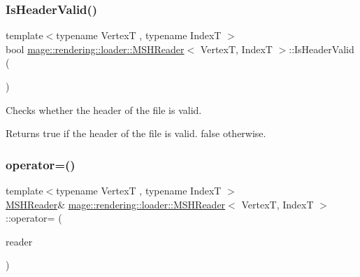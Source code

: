 \subsubsection{\texorpdfstring{Is\+Header\+Valid()}{IsHeaderValid()}}
{\footnotesize\ttfamily template$<$typename VertexT , typename IndexT $>$ \\
bool \mbox{\hyperlink{classmage_1_1rendering_1_1loader_1_1_m_s_h_reader}{mage\+::rendering\+::loader\+::\+M\+S\+H\+Reader}}$<$ VertexT, IndexT $>$\+::Is\+Header\+Valid (\begin{DoxyParamCaption}{ }\end{DoxyParamCaption})\hspace{0.3cm}{\ttfamily [private]}}

Checks whether the header of the file is valid.

\begin{DoxyReturn}{Returns}
{\ttfamily true} if the header of the file is valid. {\ttfamily false} otherwise. 
\end{DoxyReturn}
\mbox{\label{classmage_1_1rendering_1_1loader_1_1_m_s_h_reader_a106e5a6cce46777cf7ae36cb4034e1a0}} 
\subsubsection{\texorpdfstring{operator=()}{operator=()}\hspace{0.1cm}{\footnotesize\ttfamily [1/2]}}
{\footnotesize\ttfamily template$<$typename VertexT , typename IndexT $>$ \\
\mbox{\hyperlink{classmage_1_1rendering_1_1loader_1_1_m_s_h_reader}{M\+S\+H\+Reader}}\& \mbox{\hyperlink{classmage_1_1rendering_1_1loader_1_1_m_s_h_reader}{mage\+::rendering\+::loader\+::\+M\+S\+H\+Reader}}$<$ VertexT, IndexT $>$\+::operator= (\begin{DoxyParamCaption}\item[{const \mbox{\hyperlink{classmage_1_1rendering_1_1loader_1_1_m_s_h_reader}{M\+S\+H\+Reader}}$<$ VertexT, IndexT $>$ \&}]{reader }\end{DoxyParamCaption})\hspace{0.3cm}{\ttfamily [delete]}}


